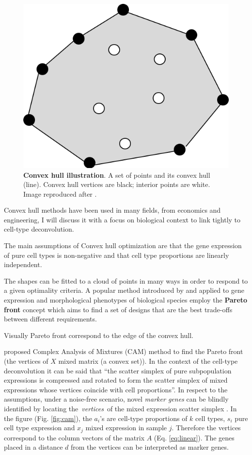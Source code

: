 \documentclass[12pt,]{book}
\theoremstyle{definition}
\theoremstyle{definition}
\theoremstyle{definition}
\theoremstyle{remark}
\begin{document}
\begin{figure}

{\centering \includegraphics[width=0.5\linewidth]{figures-ext/convexhull} 

}

\caption[Convex hull illustration]{\textbf{Convex hull illustration}. A set of
points and its convex hull (line). Convex hull vertices are black;
interior points are white. Image reproduced after \citet{Erickson2018}.}\label{fig:convexhull}
\end{figure}





Convex hull methods have been used in many fields, from economics and
engineering, I will discuss it with a focus on biological context to
link tightly to cell-type deconvolution.

The main assumptions of Convex hull optimization are that the gene
expression of pure cell types is non-negative and that cell type
proportions are linearly independent.

The shapes can be fitted to a cloud of points in many ways in order to
respond to a given optimality criteria. A popular method introduced by
\citet{Shoval2012} and applied to gene expression and morphological
phenotypes of biological species employ the \textbf{Pareto front}
concept which aims to find a set of designs that are the best trade-offs
between different requirements.

Visually Pareto front correspond to the edge of the convex hull.

\citet{Wang2013} proposed Complex Analysis of Mixtures (CAM) method to
find the Pareto front (the vertices of \(X\) mixed matrix (a convex
set)). In the context of the cell-type deconvolution it can be said that
``the scatter simplex of pure subpopulation expressions is compressed
and rotated to form the scatter simplex of mixed expressions whose
vertices coincide with cell proportions''\citep{Wang2016}. In respect to
the assumptions, under a noise-free scenario, novel \emph{marker genes}
can be blindly identified by locating the~\emph{vertices}~of the mixed
expression scatter simplex \citep{Wang2010}. In the figure (Fig.
\ref{fig:cam}), the \(a_i\)'s are cell-type proportions of \(k\) cell
types, \(s_i\) pure cell type expression and \(x_j\) mixed expression in
sample \(j\). Therefore the vertices correspond to the column vectors of
the matrix \(A\) (Eq. \eqref{eq:linear}). The genes placed in a distance
\(d\) from the vertices can be interpreted as marker genes.
\end{document}
